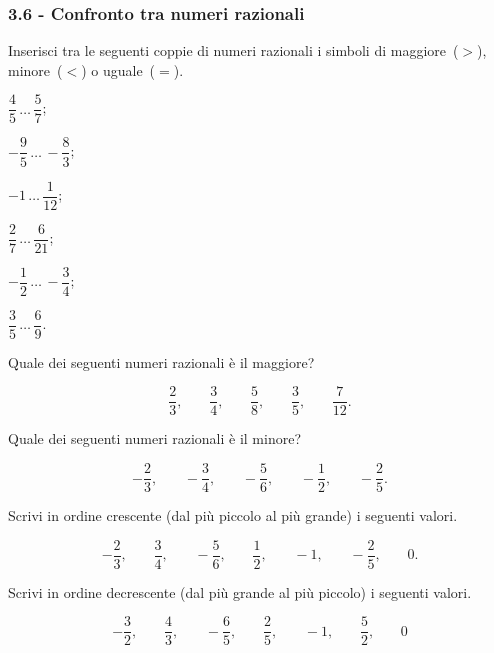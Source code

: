 \subsubsection*{3.6 - Confronto tra numeri razionali}

\begin{esercizio}
 \label{ese:3.29}
Inserisci tra le seguenti coppie di numeri razionali i simboli di maggiore~($>$), minore~($<$) o uguale~($=$).
\begin{multicols}{3}
\begin{enumeratea}
\spazielenx
 \item $\dfrac{4}{5}\,\ldots\,\dfrac{5}{7}$;
 \item $-\dfrac{9}{5}\,\ldots\,-\dfrac{8}{3}$;
 \item $-1\,\ldots\,\dfrac{1}{12}$;
 \item $\dfrac{2}{7}\,\ldots\,\dfrac{6}{21}$;
 \item $-\dfrac{1}{2}\,\ldots\,-\dfrac{3}{4}$;
 \item $\dfrac{3}{5}\,\ldots\,\dfrac{6}{9}$.
\end{enumeratea}
\end{multicols}
\end{esercizio}

\begin{esercizio}
 \label{ese:3.30}
Quale dei seguenti numeri razionali è il maggiore?

\[\frac{2}{3}\text{,}\qquad\frac{3}{4}\text{,}\qquad\frac{5}{8}\text{,}\qquad\frac{3}{5}\text{,}\qquad\frac{7}{12}.\]
\end{esercizio}


\begin{esercizio}
 \label{ese:3.31}
Quale dei seguenti numeri razionali è il minore?

\[-\frac{2}{3}\text{,}\qquad-\frac{3}{4}\text{,}\qquad-\frac{5}{6}\text{,}\qquad-\frac{1}{2}\text{,}\qquad-\frac{2}{5}.\]
\end{esercizio}

\begin{esercizio}
 \label{ese:3.32}
Scrivi in ordine crescente (dal più piccolo al più grande) i seguenti valori.

\[-\frac{2}{3}\text{,}\qquad\frac{3}{4}\text{,}\qquad-\frac{5}{6}\text{,}\qquad\frac{1}{2}\text{,}\qquad-1\text{,}\qquad-\frac{2}{5}\text{,}\qquad0.\]
\end{esercizio}

\begin{esercizio}
 \label{ese:3.33}
Scrivi in ordine decrescente (dal più grande al più piccolo) i seguenti valori.

\[-\frac{3}{2}\text{,}\qquad\frac{4}{3}\text{,}\qquad-\frac{6}{5}\text{,}\qquad\frac{2}{5}\text{,}\qquad-1\text{,}\qquad\frac{5}{2}\text{,}\qquad0\]
\end{esercizio}

